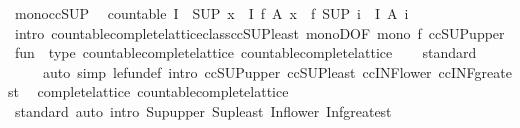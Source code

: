 \begin{isabellebody}
\endisatagproof
{\isafoldproof}%
%
\isadelimproof
\isanewline
%
\endisadelimproof
\isanewline
{}\isamarkupfalse%
\ mono{\isacharunderscore}ccSUP{\isacharcolon}\isanewline
\ \ {\isachardoublequoteopen}countable\ I\ {\isasymLongrightarrow}\ {\isacharparenleft}SUP\ x\ {\isasymin}\ I{\isachardot}\ f\ {\isacharparenleft}A\ x{\isacharparenright}{\isacharparenright}\ {\isasymle}\ f\ {\isacharparenleft}SUP\ i\ {\isasymin}\ I{\isachardot}\ A\ i{\isacharparenright}{\isachardoublequoteclose}\isanewline
%
\isadelimproof
\ \ %
\endisadelimproof
%
\isatagproof
{}\isamarkupfalse%
\ {\isacharparenleft}intro\ countable{\isacharunderscore}complete{\isacharunderscore}lattice{\isacharunderscore}class{\isachardot}ccSUP{\isacharunderscore}least\ monoD{\isacharbrackleft}OF\ {\isacartoucheopen}mono\ f{\isacartoucheclose}{\isacharbrackright}\ ccSUP{\isacharunderscore}upper{\isacharparenright}%
\endisatagproof
{\isafoldproof}%
%
\isadelimproof
\isanewline
%
\endisadelimproof
\isanewline
{}\isamarkupfalse%
\isanewline
\isanewline
{}\isamarkupfalse%
%
\isadelimdocument
%
\endisadelimdocument
%
\isatagdocument
%
\isamarkuptrue%
%
\endisatagdocument
{\isafolddocument}%
%
\isadelimdocument
%
\endisadelimdocument
{}\isamarkupfalse%
\ {\isachardoublequoteopen}fun{\isachardoublequoteclose}\ {\isacharcolon}{\isacharcolon}\ {\isacharparenleft}type{\isacharcomma}\ countable{\isacharunderscore}complete{\isacharunderscore}lattice{\isacharparenright}\ countable{\isacharunderscore}complete{\isacharunderscore}lattice\isanewline
%
\isadelimproof
\ \ %
\endisadelimproof
%
\isatagproof
{}\isamarkupfalse%
\ standard\isanewline
\ \ \ \ \ {\isacharparenleft}auto\ simp{\isacharcolon}\ le{\isacharunderscore}fun{\isacharunderscore}def\ intro{\isacharbang}{\isacharcolon}\ ccSUP{\isacharunderscore}upper\ ccSUP{\isacharunderscore}least\ ccINF{\isacharunderscore}lower\ ccINF{\isacharunderscore}greatest{\isacharparenright}%
\endisatagproof
{\isafoldproof}%
%
\isadelimproof
\isanewline
%
\endisadelimproof
\isanewline
{}\isamarkupfalse%
\ {\isacharparenleft}\ complete{\isacharunderscore}lattice{\isacharparenright}\ countable{\isacharunderscore}complete{\isacharunderscore}lattice\isanewline
%
\isadelimproof
\ \ %
\endisadelimproof
%
\isatagproof
{}\isamarkupfalse%
\ standard\ {\isacharparenleft}auto\ intro{\isacharcolon}\ Sup{\isacharunderscore}upper\ Sup{\isacharunderscore}least\ Inf{\isacharunderscore}lower\ Inf{\isacharunderscore}greatest{\isacharparenright}%

\end{isabellebody}
